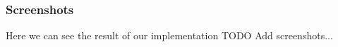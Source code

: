 \subsubsection{Screenshots}
Here we can see the result of our implementation 
TODO Add screenshots...












